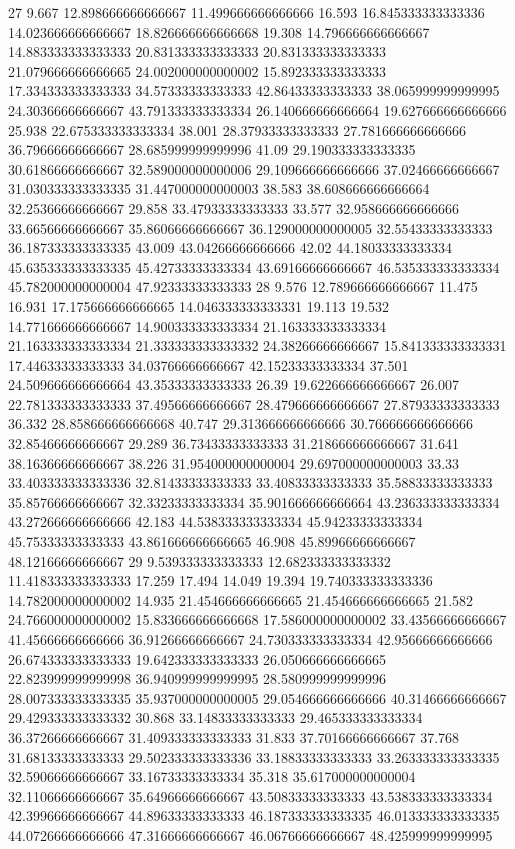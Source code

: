 27 9.667 12.898666666666667 11.499666666666666 16.593 16.845333333333336 14.023666666666667 18.826666666666668 19.308 14.796666666666667 14.883333333333333 20.831333333333333 20.831333333333333 21.079666666666665 24.002000000000002 15.892333333333333 17.334333333333333 34.57333333333333 42.86433333333333 38.065999999999995 24.30366666666667 43.791333333333334 26.140666666666664 19.627666666666666 25.938 22.675333333333334 38.001 28.37933333333333 27.781666666666666 36.79666666666667 28.685999999999996 41.09 29.190333333333335 30.61866666666667 32.589000000000006 29.109666666666666 37.02466666666667 31.030333333333335 31.447000000000003 38.583 38.608666666666664 32.25366666666667 29.858 33.47933333333333 33.577 32.958666666666666 33.66566666666667 35.86066666666667 36.129000000000005 32.55433333333333 36.187333333333335 43.009 43.04266666666666 42.02 44.18033333333334 45.635333333333335 45.42733333333334 43.69166666666667 46.535333333333334 45.782000000000004 47.92333333333333
28 9.576 12.789666666666667 11.475 16.931 17.175666666666665 14.046333333333331 19.113 19.532 14.771666666666667 14.900333333333334 21.163333333333334 21.163333333333334 21.333333333333332 24.38266666666667 15.841333333333331 17.44633333333333 34.03766666666667 42.15233333333334 37.501 24.509666666666664 43.35333333333333 26.39 19.622666666666667 26.007 22.781333333333333 37.49566666666667 28.479666666666667 27.87933333333333 36.332 28.858666666666668 40.747 29.313666666666666 30.766666666666666 32.85466666666667 29.289 36.73433333333333 31.218666666666667 31.641 38.16366666666667 38.226 31.954000000000004 29.697000000000003 33.33 33.403333333333336 32.81433333333333 33.40833333333333 35.58833333333333 35.85766666666667 32.33233333333334 35.901666666666664 43.236333333333334 43.272666666666666 42.183 44.538333333333334 45.94233333333334 45.75333333333333 43.861666666666665 46.908 45.89966666666667 48.12166666666667
29 9.539333333333333 12.682333333333332 11.418333333333333 17.259 17.494 14.049 19.394 19.740333333333336 14.782000000000002 14.935 21.454666666666665 21.454666666666665 21.582 24.766000000000002 15.833666666666668 17.586000000000002 33.43566666666667 41.45666666666666 36.91266666666667 24.730333333333334 42.95666666666666 26.674333333333333 19.642333333333333 26.050666666666665 22.823999999999998 36.940999999999995 28.580999999999996 28.007333333333335 35.937000000000005 29.054666666666666 40.31466666666667 29.429333333333332 30.868 33.14833333333333 29.465333333333334 36.37266666666667 31.409333333333333 31.833 37.70166666666667 37.768 31.68133333333333 29.502333333333336 33.18833333333333 33.263333333333335 32.59066666666667 33.16733333333334 35.318 35.617000000000004 32.11066666666667 35.64966666666667 43.50833333333333 43.538333333333334 42.39966666666667 44.89633333333333 46.187333333333335 46.013333333333335 44.07266666666666 47.31666666666667 46.06766666666667 48.425999999999995
